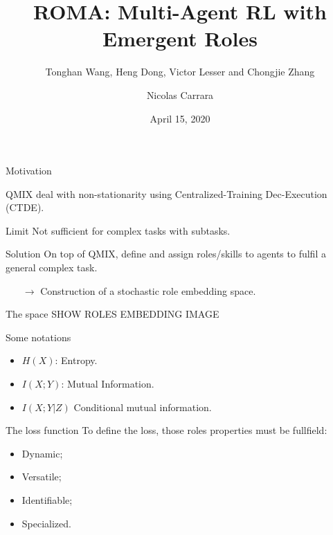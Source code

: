 \documentclass{beamer}
\author[shortname]{Nicolas Carrara}
\institute[shortinst]{University of Toronto}
\title[ROMA]{ROMA: Multi-Agent RL with Emergent Roles}
\subtitle{Tonghan Wang, Heng Dong, Victor Lesser and Chongjie Zhang}
\date{April 15, 2020}
\begin{document}
    \begin{frame}
        \maketitle
        \centering
    \end{frame}

    \begin{frame}{Motivation}

        QMIX deal with non-stationarity using Centralized-Training Dec-Execution (CTDE).

        \begin{alertblock}{Limit}
            Not sufficient for complex tasks with subtasks.
        \end{alertblock}

        \begin{exampleblock}{Solution}
            On top of QMIX, define and assign roles/skills to agents to fulfil a general complex task.
            \begin{itemize}
                \item[$\rightarrow$] Construction of a stochastic role embedding space.
            \end{itemize}
        \end{exampleblock}

    \end{frame}

    \begin{frame}{The space}
        SHOW ROLES EMBEDDING IMAGE
    \end{frame}

    \begin{frame}{Some notations}


        \begin{itemize}
            \item $H(X)$: Entropy.
            \item $I(X;Y)$: Mutual Information.
            \item $I(X;Y|Z)$ Conditional mutual information.

        \end{itemize}

    \end{frame}

    \begin{frame}{The loss function}
        To define the loss, those roles properties must be fullfield:

        \begin{itemize}
            \item Dynamic;
            \item Versatile;
            \item Identifiable;
            \item Specialized.
        \end{itemize}
    \end{frame}
\end{document}
